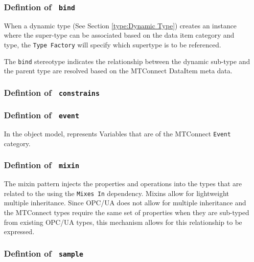 \FloatBarrier



\FloatBarrier
\subsubsection{Defintion of \texttt{ bind}} \label{type:bind}

\FloatBarrier

When a dynamic type (See Section \ref{type:Dynamic Type}) creates an instance where the super-type
can be associated based on the data item category and type, the \texttt{Type Factory} will 
specify which supertype is to be referenced.

The \texttt{bind} stereotype indicates the relationship between the dynamic sub-type and the 
parent type are resolved based on the MTConnect DataItem meta data.

\FloatBarrier
\subsubsection{Defintion of \texttt{ constrains}} \label{type:constrains}

\FloatBarrier



\FloatBarrier
\subsubsection{Defintion of \texttt{ event}} \label{type:event}

\FloatBarrier

In the object model, represents Variables that are of the MTConnect \texttt{Event} category.

\FloatBarrier
\subsubsection{Defintion of \texttt{ mixin}} \label{type:mixin}

\FloatBarrier

The mixin pattern injects the properties and operations into the types 
that are related to the using the \texttt{Mixes In} dependency. Mixins allow for
lightweight multiple inheritance. Since OPC/UA does not allow for multiple inheritance 
and the MTConnect  types require the same set of properties when they are sub-typed
from existing OPC/UA types, this mechanism allows for this relationship to be expressed.


\FloatBarrier
\subsubsection{Defintion of \texttt{ sample}} \label{type:sample}

